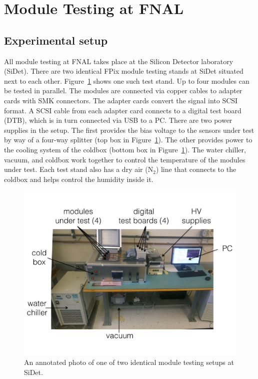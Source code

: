 \section{Module Testing at FNAL}
\label{s:testing}


\subsection{Experimental setup}
\label{ss:setup}

All module testing at FNAL takes place at the Silicon Detector laboratory (SiDet).
There are two identical FPix module testing stands at SiDet situated next to each other.
Figure~\ref{fig:setup} shows one such test stand.
Up to four modules can be tested in parallel.
The modules are connected via copper cables to adapter cards with SMK connectors.
The adapter cards convert the signal into SCSI format.
A SCSI cable from each adapter card connects to a digital test board (DTB), which is in turn connected via USB to a PC.
There are two power supplies in the setup.
The first provides the bias voltage to the sensors under test by way of a four-way splitter (top box in Figure~\ref{fig:setup}).
The other provides power to the cooling system of the coldbox (bottom box in Figure~\ref{fig:setup}).
The water chiller, vacuum, and coldbox work together to control the temperature of the modules under test.
Each test stand also has a dry air ($\textrm{N}_2$) line that connects to the coldbox and helps control the humidity inside it.

\begin{figure}[hbtp]
\begin{center}
\includegraphics[width=\textwidth]{figures/fnal_test_stand.pdf}
\caption{An annotated photo of one of two identical module testing setups at SiDet.}
\label{fig:setup}
\end{center}
\end{figure}

